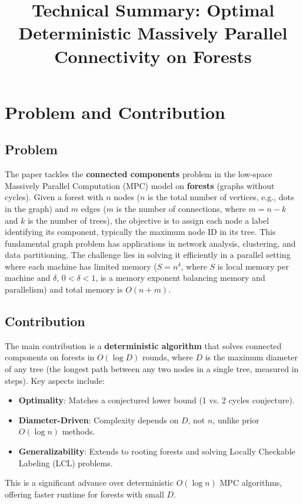 \documentclass[11pt]{article}
\title{Technical Summary: Optimal Deterministic Massively Parallel Connectivity on Forests}
\author{}
\date{}
\begin{document}
\maketitle

\section{Problem and Contribution}

\subsection{Problem}
The paper tackles the \textbf{connected components} problem in the low-space Massively Parallel Computation (MPC) model on \textbf{forests} (graphs without cycles). Given a forest with \(n\) nodes (\(n\) is the total number of vertices, e.g., dots in the graph) and \(m\) edges (\(m\) is the number of connections, where \(m = n - k\) and \(k\) is the number of trees), the objective is to assign each node a label identifying its component, typically the maximum node ID in its tree. This fundamental graph problem has applications in network analysis, clustering, and data partitioning. The challenge lies in solving it efficiently in a parallel setting where each machine has limited memory (\(S = n^\delta\), where \(S\) is local memory per machine and \(\delta\), \(0 < \delta < 1\), is a memory exponent balancing memory and parallelism) and total memory is \(O(n + m)\).

\subsection{Contribution}
The main contribution is a \textbf{deterministic algorithm} that solves connected components on forests in \(O(\log D)\) rounds, where \(D\) is the maximum diameter of any tree (the longest path between any two nodes in a single tree, measured in steps). Key aspects include:
\begin{itemize}
    \item \textbf{Optimality}: Matches a conjectured lower bound (1 vs. 2 cycles conjecture).
    \item \textbf{Diameter-Driven}: Complexity depends on \(D\), not \(n\), unlike prior \(O(\log n)\) methods.
    \item \textbf{Generalizability}: Extends to rooting forests and solving Locally Checkable Labeling (LCL) problems.
\end{itemize}
This is a significant advance over deterministic \(O(\log n)\) MPC algorithms, offering faster runtime for forests with small \(D\).
\end{document}
